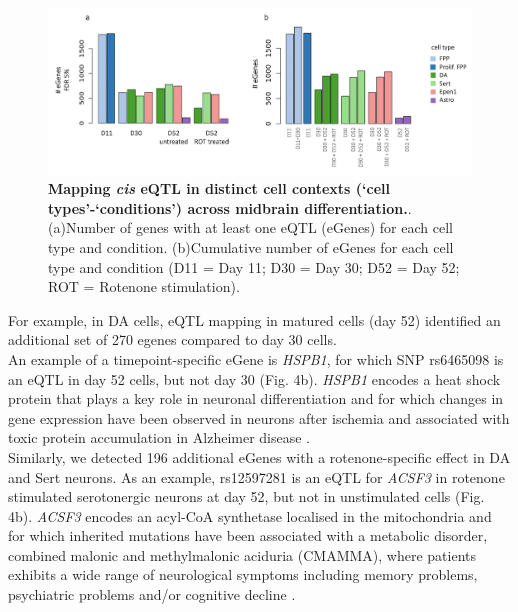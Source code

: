\begin{figure}[h]
\centering
\includegraphics[width=16cm]{Chapter5/Fig/neuroseq_eqtl.png}
\caption[Mapping eQTL across neuronal cell types]{\textbf{Mapping \textit{cis} eQTL in distinct cell contexts (`cell types'-`conditions') across midbrain differentiation.}.\\
(a)Number of genes with at least one eQTL (eGenes) for each cell type and condition.
(b)Cumulative number of eGenes for each cell type and condition (D11 = Day 11; D30 = Day 30; D52 = Day 52; ROT = Rotenone stimulation).}
\label{fig:neuroseq_eqtl}
\end{figure}

For example, in DA cells, eQTL mapping in matured cells (day 52) identified an additional set of 270 egenes compared to day 30 cells.\\

An example of a timepoint-specific eGene is \textit{HSPB1}, for which SNP rs6465098 is an eQTL in day 52 cells, but not day 30 (Fig. 4b). 
\textit{HSPB1} encodes a heat shock protein that plays a key role in neuronal differentiation \cite{miller2018heat} and for which changes in gene expression have been observed in neurons after ischemia \cite{bartelt2016hspb5} and associated with toxic protein accumulation in Alzheimer disease \cite{shimura2004binding, wilhelmus2006small}.\\

Similarly, we detected 196 additional eGenes with a rotenone-specific effect in DA and Sert neurons. 
As an example, rs12597281 is an eQTL for \textit{ACSF3} in rotenone stimulated serotonergic neurons at day 52, but not in unstimulated cells (Fig. 4b). 
\textit{ACSF3} encodes an acyl-CoA synthetase localised in the mitochondria and for which inherited mutations have been associated with a metabolic disorder, combined malonic and methylmalonic aciduria (CMAMMA), where patients exhibits a wide range of neurological symptoms including memory problems, psychiatric problems and/or cognitive decline \cite{tucci2020brain}.\\

